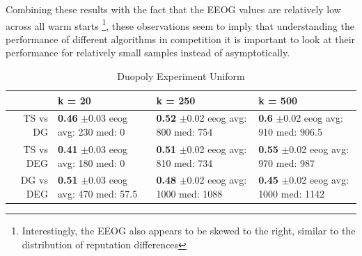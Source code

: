 \documentclass{article}
\theoremstyle{definition}
\begin{document}
Combining these results with the fact that the EEOG values are relatively low across all warm starts \footnote{Interestingly, the EEOG also appears to be skewed to the right, similar to the distribution of reputation differences}, these observations seem to imply that understanding the performance of different algorithms in competition it is important to look at their performance for relatively small samples instead of asymptotically.

\begin{table}[ht]
\centering
\caption{Duopoly Experiment Uniform} 
\begin{tabular}{rlll}
  \hline
 & k = 20 & k = 250 & k = 500 \\ 
  \hline
TS vs DG & \makecell{\textbf{0.46} $\pm$0.03\\ eeog \\ avg: 230\\ med: 0} & \makecell{\textbf{0.52} $\pm$0.02\\ eeog \\ avg: 800\\ med: 754} & \makecell{\textbf{0.6} $\pm$0.02\\ eeog \\ avg: 910\\ med: 906.5} \\ 
  TS vs DEG & \makecell{\textbf{0.41} $\pm$0.03\\ eeog \\ avg: 180\\ med: 0} & \makecell{\textbf{0.51} $\pm$0.02\\ eeog \\ avg: 810\\ med: 734} & \makecell{\textbf{0.55} $\pm$0.02\\ eeog \\ avg: 970\\ med: 987} \\ 
  DG vs DEG & \makecell{\textbf{0.51} $\pm$0.03\\ eeog \\ avg: 470\\ med: 57.5} & \makecell{\textbf{0.48} $\pm$0.02\\ eeog \\ avg: 1000\\ med: 1088} & \makecell{\textbf{0.45} $\pm$0.02\\ eeog \\ avg: 1000\\ med: 1142} \\ 
   \hline
\end{tabular}
\label{sim_unif}
\end{table}
\end{document}
